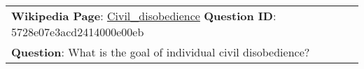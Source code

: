 \begin{figure*}[ht]
{\begin{tabular}{p{}}
            \textbf{Wikipedia Page}: \underline{Civil\_disobedience} \textbf{Question ID}: 5728e07e3acd2414000e00eb                                                                                                                                                                                                                                                                                                                                                                                                                                                                                                                                                                                                                                                                                                                                                                                                                                                                                                                                                                                                                                                \\
            \textbf{Question}: What is the goal of individual civil disobedience?                                                                                                                                                                                                                                                                                                                                                                                                                                                                                                                                                                                                                                                                                                                                                                                                                                                                                                                                                                                                                                                                                  \\

\end{tabular}}
\end{figure*}
